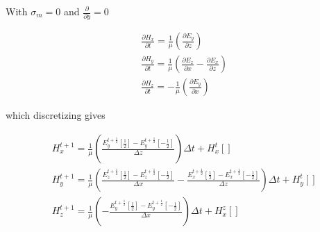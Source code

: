 With $\sigma_m=0$ and $\frac{\partial}{\partial y}=0$

\begin{equation}
\begin{split}
  &\frac{\partial  H_{x}}{\partial t} = \frac{1}{\mu} \left ( \frac{\partial  E_{y}}{\partial z} \right )\\
  &\frac{\partial  H_{y}}{\partial t} = \frac{1}{\mu} \left ( \frac{\partial  E_{z}}{\partial x}-\frac{\partial  E_{x}}{\partial z} \right )\\
  &\frac{\partial  H_{z}}{\partial t} = - \frac{1}{\mu} \left ( \frac{\partial  E_{y}}{\partial x} \right )
\end{split}
\end{equation}


which discretizing gives

\begin{equation}
\begin{split}
  & H_{x}^{t+1} = \frac{1}{\mu} \left ( \frac{E_{y}^{t+\frac{1}{2}}[\frac{1}{2}]-E_{y}^{t+\frac{1}{2}}[-\frac{1}{2}]}{\Delta z} \right ) \Delta t + H_{x}^{t}[]\\
  & H_{y}^{t+1} = \frac{1}{\mu} \left ( \frac{E_{z}^{t+\frac{1}{2}}[\frac{1}{2}]-E_{z}^{t+\frac{1}{2}}[-\frac{1}{2}]}{\Delta x}-\frac{E_{x}^{t+\frac{1}{2}}[\frac{1}{2}]-E_{x}^{t+\frac{1}{2}}[-\frac{1}{2}]}{\Delta z} \right ) \Delta t+ H_{y}^{t}[]\\
  & H_{z}^{t+1} =  \frac{1}{\mu} \left ( - \frac{E_{y}^{t+\frac{1}{2}}[\frac{1}{2}]-E_{y}^{t+\frac{1}{2}}[-\frac{1}{2}]}{\Delta x} \right ) \Delta t + H_{x}^{z}[]
\end{split}
\end{equation}
